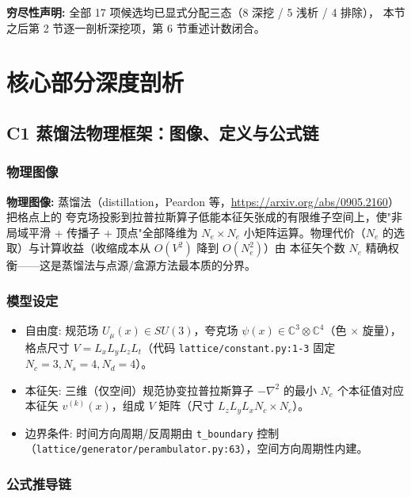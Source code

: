 \documentclass[UTF8]{ctexart}
\begin{document}
\begin{keybox}
\textbf{穷尽性声明:} 全部 17 项候选均已显式分配三态（8 深挖 / 5 浅析 / 4 排除），
本节之后第 2 节逐一剖析深挖项，第 6 节重述计数闭合。
\end{keybox}

\section{核心部分深度剖析}

\subsection{C1 蒸馏法物理框架：图像、定义与公式链}
\label{sec:c1}

\subsubsection{物理图像}
\begin{physbox}
\textbf{物理图像:} 蒸馏法（distillation，Peardon 等，\url{https://arxiv.org/abs/0905.2160}）把格点上的
夸克场投影到拉普拉斯算子低能本征矢张成的有限维子空间上，使"非局域平滑 + 传播子 + 顶点"全部降维为
$N_e \times N_e$ 小矩阵运算。物理代价（$N_e$ 的选取）与计算收益（收缩成本从 $O(V^2)$ 降到 $O(N_e^2)$）由
本征矢个数 $N_e$ 精确权衡——这是蒸馏法与点源/盒源方法最本质的分界。
\end{physbox}

\subsubsection{模型设定}
\begin{itemize}
\item 自由度: 规范场 $U_\mu(x)\in SU(3)$，夸克场 $\psi(x)\in\mathbb{C}^3 \otimes \mathbb{C}^4$（色 $\times$ 旋量），
  格点尺寸 $V = L_xL_yL_zL_t$（代码 \texttt{lattice/constant.py:1-3} 固定 $N_c=3, N_s=4, N_d=4$）。
\item 本征矢: 三维（仅空间）规范协变拉普拉斯算子 $-\nabla^2$ 的最小 $N_e$ 个本征值对应本征矢
  $v^{(k)}(x)$，组成 $V$ 矩阵（尺寸 $L_zL_yL_xN_c \times N_e$）。
\item 边界条件: 时间方向周期/反周期由 \nolinkurl{t_boundary} 控制
  （\texttt{\nolinkurl{lattice/generator/perambulator.py:63}}），空间方向周期性内建。
\end{itemize}

\subsubsection{公式推导链}
\label{sec:c1_formulas}
\end{document}
